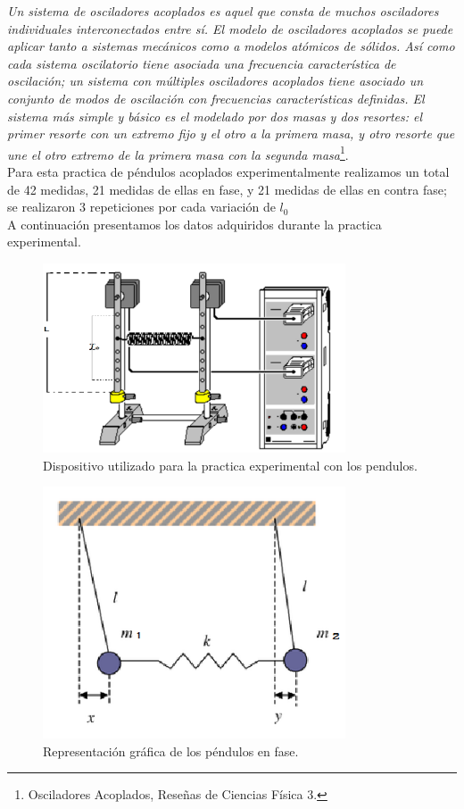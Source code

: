 \documentclass{article}
\begin{document}
\textit{Un sistema de osciladores acoplados es aquel que consta de muchos osciladores individuales interconectados entre sí. El modelo de osciladores acoplados se puede aplicar tanto a sistemas mecánicos como a modelos atómicos de sólidos.
Así como cada sistema oscilatorio tiene asociada una frecuencia característica de oscilación; un sistema con múltiples osciladores acoplados tiene asociado un conjunto de modos de oscilación con frecuencias características definidas.
El sistema más simple y básico es el modelado por dos masas y dos resortes: el primer resorte con un extremo fijo y el otro a la primera masa, y otro resorte que une el otro extremo de la primera masa con la segunda masa}\footnote{Osciladores Acoplados, Reseñas de Ciencias Física 3.}.
\\ 
Para esta practica de péndulos acoplados experimentalmente realizamos un total de 42 medidas, 21 medidas de ellas en fase, y 21 medidas de ellas en contra fase; se realizaron 3 repeticiones por cada variación de $l_{0}$\\ A continuación presentamos los datos adquiridos durante la practica experimental.
\begin{figure}[H]
  \centering
     \includegraphics[width=0.80\textwidth]{img/dispositivopaco}
  \caption{Dispositivo utilizado para la practica experimental con los pendulos.}
      \label{fig:dispositivo}
\end{figure}
\begin{figure}[H]
  \centering
     \includegraphics[width=0.80\textwidth]{img/pendulosfase}
  \caption{Representación gráfica de los péndulos en fase.}
      \label{fig:dispositivo}
\end{figure}
\end{document}
